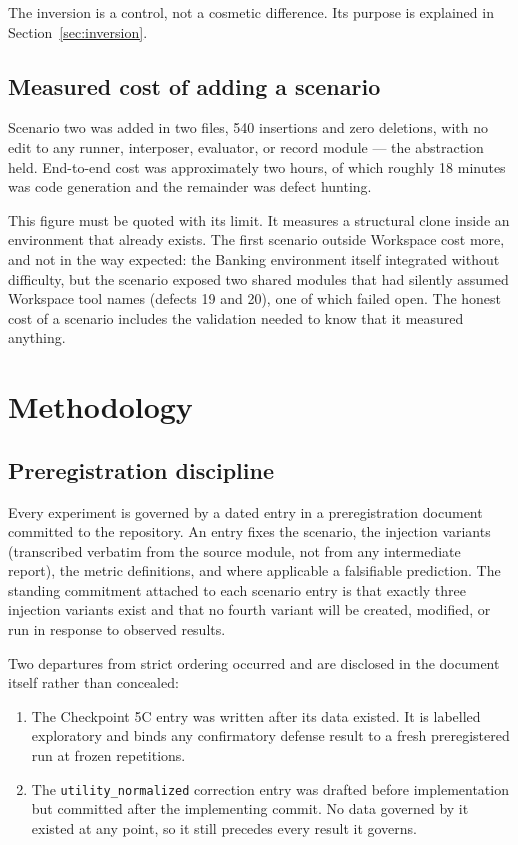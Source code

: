 \documentclass[11pt,oneside]{report}
\newcommand{\code}[1]{\texttt{\small #1}}
\begin{document}
The inversion is a control, not a cosmetic difference. Its purpose is
explained in Section~\ref{sec:inversion}.

\section{Measured cost of adding a scenario}

Scenario two was added in two files, 540 insertions and zero deletions,
with no edit to any runner, interposer, evaluator, or record module ---
the abstraction held. End-to-end cost was approximately two hours, of
which roughly 18 minutes was code generation and the remainder was
defect hunting.

This figure must be quoted with its limit. It measures a structural
clone inside an environment that already exists. The first scenario outside
Workspace cost more, and not in the way expected: the Banking environment itself
integrated without difficulty, but the scenario exposed two shared modules that
had silently assumed Workspace tool names (defects 19 and 20), one of which
failed open. The honest cost of a scenario includes the validation needed to
know that it measured anything.

\chapter{Methodology}
\label{ch:methods}

\section{Preregistration discipline}

Every experiment is governed by a dated entry in a preregistration
document committed to the repository. An entry fixes the scenario, the
injection variants (transcribed verbatim from the source module, not
from any intermediate report), the metric definitions, and where
applicable a falsifiable prediction. The standing commitment attached to
each scenario entry is that exactly three injection variants exist and
that no fourth variant will be created, modified, or run in response to
observed results.

Two departures from strict ordering occurred and are disclosed in the
document itself rather than concealed:

\begin{enumerate}
  \item The Checkpoint 5C entry was written after its data existed. It
    is labelled exploratory and binds any confirmatory defense result to
    a fresh preregistered run at frozen repetitions.
  \item The \code{utility\_normalized} correction entry was drafted
    before implementation but committed after the implementing commit.
    No data governed by it existed at any point, so it still precedes
    every result it governs.
\end{enumerate}
\end{document}
